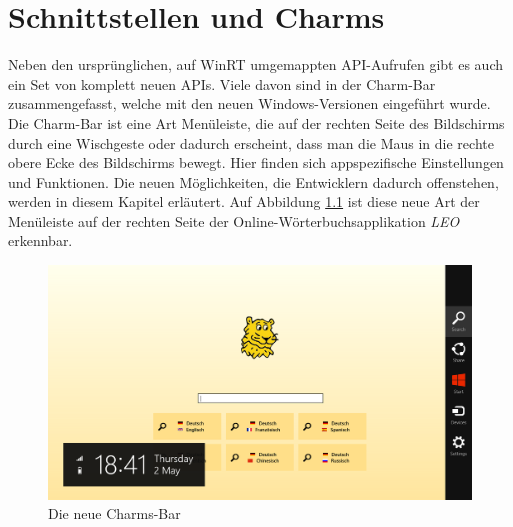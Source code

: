 \documentclass[a4paper,bibtotoc,oneside]{scrbook}
\begin{document}

\chapter[Schnittstellen und Charms]{Schnittstellen und Charms}\label{charms}
Neben den ursprünglichen, auf WinRT umgemappten API-Aufrufen gibt es auch ein Set von komplett neuen APIs. Viele davon sind in der Charm-Bar zusammengefasst, welche mit den neuen Windows-Versionen eingeführt wurde. Die Charm-Bar ist eine Art Menüleiste, die auf der rechten Seite des Bildschirms durch eine Wischgeste oder dadurch erscheint, dass man die Maus in die rechte obere Ecke des Bildschirms bewegt. Hier finden sich appspezifische Einstellungen und Funktionen. Die neuen Möglichkeiten, die Entwicklern dadurch offenstehen, werden in diesem Kapitel erläutert.
Auf Abbildung \ref{Abb7} ist diese neue Art der Menüleiste auf der rechten Seite der Online-Wörterbuchsapplikation \textit{LEO} erkennbar.
\newline
\begin{figure}[htbp]
\centering
\includegraphics[scale=0.425]{images/charms.png}
\caption[Die neue Charms-Bart]{Die neue Charms-Bar}\label{Abb7}
\end{figure}
\newline
\end{document}
